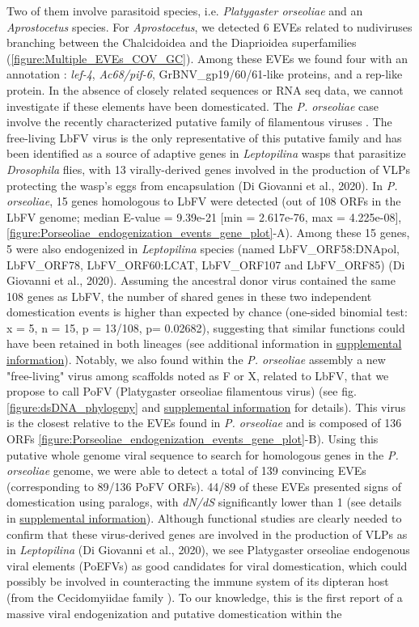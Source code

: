 Two of them involve parasitoid species, i.e. \textit{Platygaster orseoliae} and an \textit{Aprostocetus} species. For \textit{Aprostocetus}, we detected 6 EVEs related to nudiviruses branching between the Chalcidoidea and the Diaprioidea superfamilies (\figurename{\ref{figure:Multiple_EVEs_COV_GC}}). Among these EVEs we found four with an annotation : \textit{lef-4}, \textit{Ac68/pif-6}, GrBNV\_gp19/60/61-like proteins,  and a rep-like protein. In the absence of closely related sequences or RNA seq data, we cannot investigate if these elements have been domesticated. The \textit{P. orseoliae} case involve the recently characterized putative family of filamentous viruses \citep{lepetit_genome_2017}. The free-living LbFV virus is the only representative of this putative family and has been identified as a source of adaptive genes in \textit{Leptopilina} wasps that parasitize \textit{Drosophila} flies, with 13 virally-derived genes involved in the production of VLPs protecting the wasp's eggs from encapsulation (Di Giovanni et al., 2020). In \textit{P. orseoliae}, 15 genes homologous to LbFV were detected (out of 108 ORFs in the LbFV genome; median E-value = 9.39e-21 [min = 2.617e-76, max = 4.225e-08], \figurename{ \ref{figure:Porseoliae_endogenization_events_gene_plot}}-A). Among these 15 genes, 5 were also endogenized in \textit{Leptopilina} species (named LbFV\_ORF58:DNApol, LbFV\_ORF78, LbFV\_ORF60:LCAT, LbFV\_ORF107 and LbFV\_ORF85) (Di Giovanni et al., 2020). Assuming the ancestral donor virus contained the same 108 genes as LbFV, the number of shared genes in these two independent domestication events is higher than expected by chance (one-sided binomial test: x = 5, n = 15, p = 13/108, p= 0.02682), suggesting  that similar functions could have been retained in both lineages (see additional information in \hyperref[sec:SI-2]{supplemental information}). Notably, we also found within the \textit{P. orseoliae} assembly a new "free-living" virus among scaffolds noted as F or X, related to LbFV, that we propose to call PoFV (Platygaster orseoliae filamentous virus) (see fig. \ref{figure:dsDNA_phylogeny} and  \hyperref[sec:SI-2]{supplemental information} for details). This virus is the closest relative to the EVEs found in \textit{P. orseoliae} and is composed of 136 ORFs \figurename{\ref{figure:Porseoliae_endogenization_events_gene_plot}}-B). Using this putative whole genome viral sequence to search for homologous genes in the \textit{P. orseoliae} genome, we were able to detect a total of 139 convincing EVEs (corresponding to 89/136 PoFV ORFs). 44/89 of these EVEs presented signs of domestication using paralogs, with \textit{dN/dS} significantly lower than 1 (see details in  \hyperref[sec:SI-2]{supplemental information}). Although functional studies are clearly needed to confirm that these virus-derived genes are involved in the production of VLPs as in \textit{Leptopilina} (Di Giovanni et al., 2020), we see Platygaster orseoliae endogenous viral elements (PoEFVs) as good candidates for viral domestication, which could possibly be involved in counteracting the immune system of its dipteran host (from the Cecidomyiidae family \citep{buhl_new_2016}). To our knowledge, this is the first report of a massive viral endogenization and putative domestication within the 